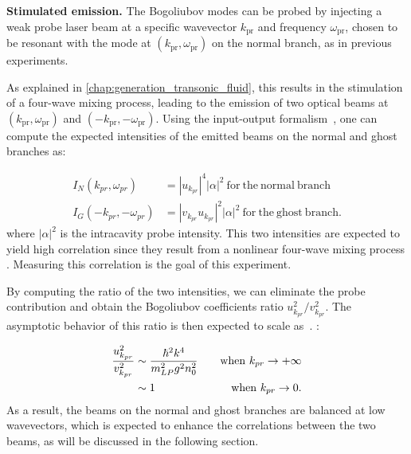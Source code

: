 \bigskip

\textbf{Stimulated emission.} The Bogoliubov modes can be probed by injecting a weak probe laser beam at a specific wavevector $k_{\mathrm{pr}}$ and frequency $\omega_{\mathrm{pr}}$, chosen to be resonant with the mode at $(k_{\mathrm{pr}}, \omega_{\mathrm{pr}})$ on the normal branch, as in previous experiments. 

As explained in \autoref{chap:generation_transonic_fluid}, this results in the stimulation of a four-wave mixing process, leading to the emission of two optical beams at $(k_{\mathrm{pr}}, \omega_{\mathrm{pr}})$ and $(-k_{\mathrm{pr}}, -\omega_{\mathrm{pr}})$. 
Using the input-output formalism~\cite{I_frerot_PRX_2023}, one can compute the expected intensities of the emitted beams on the normal and ghost branches as:


\begin{equation}
    \label{eq:uv_intensity2}
    \begin{aligned}
    I_N(k_{pr},\omega_{pr}) &= |u_{k_{pr}}|^4 |\alpha|^2  \  \mathrm{for \ the \ normal \ branch } \\
    I_G(-k_{pr},-\omega_{pr}) &= |v_{k_{pr}}u_{k_{pr}}|^2 |\alpha|^2 \ \mathrm{ for \ the \ ghost \  branch.}
    \end{aligned}
\end{equation}
where $|\alpha|^2$ is the intracavity probe intensity. This two intensities are expected to yield high correlation since they result from a nonlinear four-wave mixing process \cite{glorieux_quantum_2011,romanelli_4wm_2007}. Measuring this correlation is the goal of this experiment.

By computing the ratio of the two intensities, we can eliminate the probe contribution and obtain the Bogoliubov coefficients ratio $u_{k_{pr}}^2/v_{k_{pr}}^2$. 
The asymptotic behavior of this ratio is then expected to scale as~\cite{castin_bose-einstein_2001}. :

\begin{equation}
    \begin{aligned}
    \dfrac{u_{k_{pr}}^2}{v_{k_{pr}}^2} & \sim \dfrac{\hbar^2k^4}{m_{LP}^2g^2n_0^2} \  \ \ &\mathrm{when} \ k_{pr} \to +\infty \\
    &\sim 1 \ \ &\mathrm{ when} \ k_{pr} \to 0.
    \end{aligned}
\end{equation}
As a result, the beams on the normal and ghost branches are balanced at low wavevectors, which is expected to enhance the correlations between the two beams, as will be discussed in the following section.


